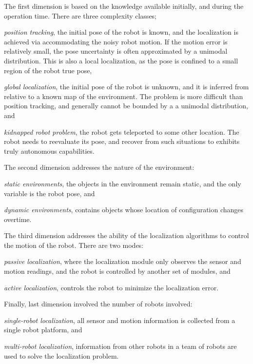 \documentclass[10pt,journal,compsoc]{IEEEtran}
\begin{document}
The first dimension is based on the knowledge available initially, and during the operation time.  There are three complexity classes; \begin{enumerate*} \item \textit{position tracking}, the initial pose of the robot is known, and the localization is achieved via accommodating the noisy robot motion. If the motion error is relatively small, the pose uncertainty is often approximated by a unimodal distribution.  This is also a local localization, as the pose is confined to a small region of the robot true pose, \item \textit{global localization}, the initial pose of the robot is unknown, and it is inferred from relative to a known map of the environment. The problem is  more difficult than position tracking, and generally cannot be bounded by a a unimodal distribution, and \item \textit{kidnapped robot problem}, the robot gets teleported to some other location. The robot needs to reevaluate its pose, and recover from such situations to exhibits truly autonomous capabilities. \end{enumerate*} 

The second dimension addresses the nature of the environment: \begin{enumerate*} \item \textit{static environments}, the objects in the environment remain static, and the only variable is the robot pose, and \item \textit{dynamic environments}, contains objects whose location of configuration changes overtime.  \end{enumerate*}

The third dimension addresses the ability of the localization algorithms to control the motion of the robot. There are two modes: \begin{enumerate*} \item \textit{passive localization}, where the localization module only observes the sensor and motion readings, and the robot is controlled by another set of modules, and \item \textit{active localization}, controls the robot to minimize the localization error.  \end{enumerate*} 

Finally, last dimension involved the number of robots involved: \begin{enumerate*} \item \textit{single-robot localization}, all sensor and motion information is collected from a single robot platform, and \item \textit{multi-robot localization}, information from other robots in a team of robots are used to solve the localization problem. \end{enumerate*}
\end{document}
